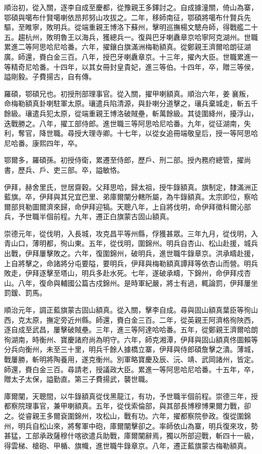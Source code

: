 \begin{pinyinscope}
順治初，從入關，逐李自成至慶都，從豫親王多鐸討之。自成據潼關，倚山為寨，鄂碩與噶布什賢噶喇依昂邦努山攻拔之。二年，移師南征，鄂碩將噶布什賢兵先驅，至睢寧，敗明兵。從端重親王博洛下蘇州，擊明巡撫楊文驄舟師，得戰艦二十五。趨杭州，敗明魯王以海兵，獲總兵一。復與巴牙喇纛章京哈寧阿克湖州。世職累進二等阿思哈尼哈番。六年，擢鑲白旗滿洲梅勒額真。從鄭親王濟爾哈朗征湖廣。師還，賚白金三百。八年，授巴牙喇纛章京。十三年，擢內大臣。世職累進一等精奇尼哈番。十四年，以其女冊封皇貴妃，進三等伯。十四年，卒，贈三等侯，謚剛毅。子費揚古，自有傳。

羅碩，鄂碩兄也。初授刑部理事官。從入關，擢甲喇額真。順治六年，姜襄叛，命梅勒額真卦喇駐軍太原。瓖遣兵陷清源，與卦喇分道擊之，瓖兵棄城走，斬五千餘級。瓖遣兵犯太原，從端重親王博洛破賊壘，斬萬餘級。其徒圍絳州，擾浮山，迭戰勝之。八年，擢工部侍郎。進世職三等阿思哈尼哈番。九年，從征湖南，失利，奪官，降世職。尋授大理寺卿。十七年，以從女追冊端敬皇后，授一等阿思哈尼哈番。康熙四年，卒。

鄂爾多，羅碩孫。初授侍衛，累遷至侍郎，歷戶、刑二部。授內務府總管，擢尚書，歷兵、戶、吏三部。卒，謚敏恪。

伊拜，赫舍里氏，世居齋穀。父拜思哈，歸太祖，授牛錄額真。旗制定，隸滿洲正藍旗。卒，伊拜與其兄宜巴里、弟庫爾闡分轄所屬，為牛錄額真。太宗即位，察哈爾部貝勒圖爾濟來歸，命伊拜迎犒。天聰八年，上自將伐明，命伊拜徵科爾沁部兵，予世職半個前程。九年，遷正白旗蒙古固山額真。

崇德元年，從伐明，入長城，攻克昌平等州縣，俘獲甚眾。三年九月，從伐明，入青山口，薄明都，徇山東。五年，從伐明，圍錦州。明兵自杏山、松山赴援，城兵出戰，伊拜屢擊敗之。六年，復圍錦州，破明兵，進世職牛錄章京。洪承疇赴援，上自將擊之，命諸將分屯要隘，要明兵，伊拜與梅勒額真譚拜等依杏山而營。明兵敗走，伊拜逐擊至塔山，明兵多赴水死。七年，遂破承疇，下錦州，命伊拜戍杏山。八年，復命與輔國公篇古戍錦州。是時軍紀嚴，將士有過，輒論罰，伊拜屢坐罰鍰、罰馬。

順治元年，調正藍旗蒙古固山額真。從入關，擊李自成。尋與固山額真葉臣等徇山西，克太原，撫定旁近州縣。師還，賚白金三百。二年，從英親王阿濟格徇陜西，逐自成至武昌，屢擊破賊壘。三年，進三等阿達哈哈番。五年，從鄭親王濟爾哈朗徇湖南，時衡州、寶慶諸府尚為明守。六年，師克湘潭，伊拜與固山額真佟圖賴等分兵向衡州，未至三十里，明兵千餘人據橋立寨，伊拜與侍郎碩詹擊之潰。薄城，戰屢勝，斬明將陶養用，遂克衡州。別軍略寶慶及辰、沅、靖、武岡諸州，皆定。師還，賚白金三百。尋請老，授議政大臣。累進一等阿思哈尼哈番。十五年，卒，贈太子太保，謚勤直。第三子費揚武，襲世職。

庫爾闡，天聰間，以牛錄額真從伐黑龍江，有功，予世職半個前程。崇德三年，授都察院理事官，兼甲喇額真。五年，從伐索倫部，與其部長博穆博果爾力戰，卻之。從睿親王多爾袞圍錦州，攻松山，戰有功。六年，擢都察院參政。復從圍錦州，明兵自松山來，將奪軍中砲，庫爾闡擊卻之。率師依山為寨，明兵復來攻，勢甚猛，工部承政薩穆什喀欲遣兵助戰，庫爾闡辭焉，獨以所部迎戰，斬四十一級，得雲梯、槍砲、甲楯、旗幟，進世職牛錄章京。八年，遷正藍旗蒙古梅勒額真。


\end{pinyinscope}
